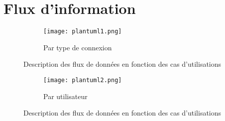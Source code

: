 \section{Flux d'information}
\begin{figure}[h]
	\centering
	\begin{subfigure}{\linewidth}
		\centering
		\texttt{[image: plantuml1.png]}
		\caption{Par type de connexion}
	\end{subfigure}
	\caption{Description des flux de données en fonction des cas d'utilisations}
\end{figure}
\begin{figure}[ht]
	\ContinuedFloat\centering
	\begin{subfigure}{\linewidth}
		\centering
		\texttt{[image: plantuml2.png]}
		\caption{Par utilisateur}
	\end{subfigure}
	\caption{Description des flux de données en fonction des cas d'utilisations}
\end{figure}